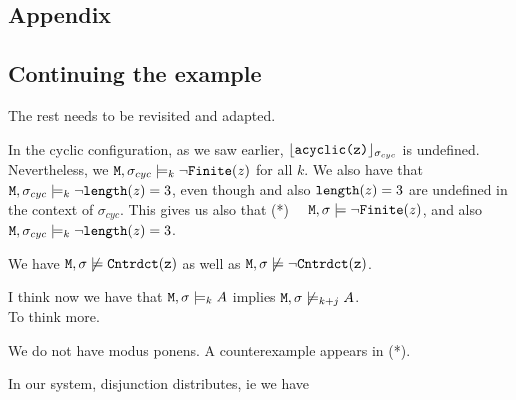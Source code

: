 \documentclass[acmsmall,screen]{acmart}
\begin{document}
\begin{appendix}

\section{Appendix}

\subsection{Continuing the example}
\begin{example}[continued]
The rest needs to be revisited and adapted.

\vspace{.04in}
In the cyclic configuration, as we saw earlier, ${\lfloor{ {{\mbox{\tt{acyclic(z)}}}}}\rfloor_{\sigma_{cyc}}}$ is undefined. Nevertheless, we  ${\mbox{\tt{M}}}, \sigma_{cyc} \models_k \neg {\mbox{\tt{Finite}}}({z})$ for all $k$.
  We also have that ${\mbox{\tt{M}}}, \sigma_{cyc} \models_k \neg {\mbox{\tt{length}}}(z)=3$, even though   and also ${\mbox{\tt{length}}}(z)=3$ are undefined
 in the context of $\sigma_{cyc}$.
This gives us   also that
(*) \ \ ${\mbox{\tt{M}}}, \sigma \models \neg {\mbox{\tt{Finite}}}({z})$, and also ${\mbox{\tt{M}}}, \sigma_{cyc} \models_k \neg {\mbox{\tt{length}}}(z)=3$.
\end{example}

\begin{example}[Cntrdr]

 We have ${\mbox{\tt{M}}},\sigma \not\models  {\mbox{\tt{Cntrdct}}}({\mbox{\tt{z}}})$ as well as ${\mbox{\tt{M}}},\sigma \not\models    \neg{\mbox{\tt{Cntrdct}}}({\mbox{\tt{z}}})$.
 \end{example}


\begin{observation}[Monotonicity]

I think now we have that  ${\mbox{\tt{M}}}, \sigma \models_k  A$ implies ${\mbox{\tt{M}}}, \sigma \not\models_{k+j}  A$.
\\
To think more.

\end{observation}

\begin{observation}

We do not have modus ponens. A counterexample appears in (*).


\end{observation}


\begin{observation}

In our system, disjunction distributes, ie we have


\end{observation}
\end{appendix}
\end{document}
